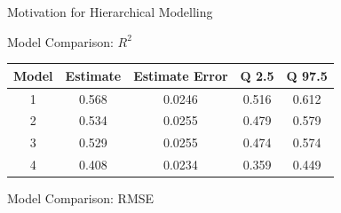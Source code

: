 \documentclass{beamer}
\begin{document}
\begin{frame}{Motivation for Hierarchical Modelling}
\begin{frame}{Model Comparison: $R^2$ }
    \begin{center}
        
   
    \begin{tabular}{|c|c|c|c|c|}

        \hline
        Model & Estimate & Estimate Error & Q 2.5 & Q 97.5 \\
        \hline
        1 & 0.568   & 0.0246 & 0.516 & 0.612 \\
        2 & 0.534 & 0.0255&  0.479 & 0.579\\
        3 & 0.529 &  0.0255 &  0.474& 0.574 \\
        4 & 0.408 & 0.0234 & 0.359 & 0.449 \\
        \hline


    \end{tabular}  
\end{center}
\end{frame}

\begin{frame}{Model Comparison: RMSE}
    \begin{figure}[h!]
        \centering
        

\end{figure}
\end{frame}
\end{frame}
\end{document}
